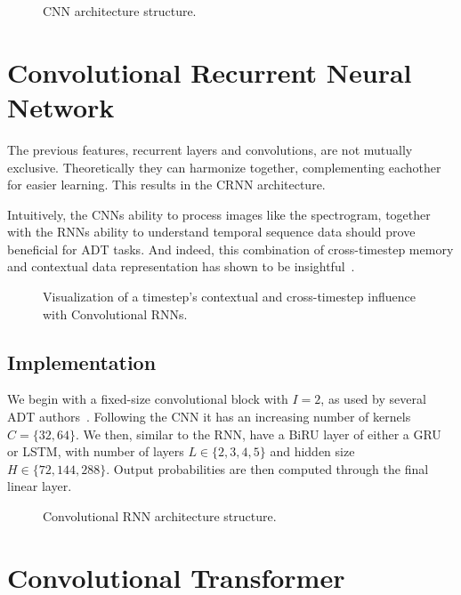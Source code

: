 \begin{figure}[H]
    \centering
    
    \caption{CNN architecture structure.}
    \label{CNNFigure}
\end{figure}

\section[Convolutional RNN]{Convolutional Recurrent Neural Network}

The previous features, recurrent layers and convolutions, are not mutually exclusive. Theoretically they can harmonize together, complementing eachother for easier learning. This results in the \gls{CRNN} architecture.

Intuitively, the \gls{CNN}s ability to process images like the spectrogram, together with the \gls{RNN}s ability to understand temporal sequence data should prove beneficial for \gls{ADT} tasks. And indeed, this combination of cross-timestep memory and contextual data representation has shown to be insightful~\cite{Vogl2017DrumTV, vogl2018multiinstrumentdrumtranscription, signals4040042}.

\begin{figure}[H]
    \centering
    
    \caption{Visualization of a timestep's contextual and cross-timestep influence with Convolutional RNNs.}
    \label{CRNNInfluenceFigure}
\end{figure}

\subsection{Implementation}

We begin with a fixed-size convolutional block with $I = 2$, as used by several \gls{ADT} authors~\cite{Vogl2017DrumTV, signals4040042}. Following the \gls{CNN} it has an increasing number of kernels $C = \{32, 64\}$. We then, similar to the \gls{RNN}, have a \gls{BiRU} layer of either a \gls{GRU} or \gls{LSTM}, with number of layers $L \in \{2, 3, 4, 5\}$ and hidden size $H \in \{72, 144, 288\}$. Output probabilities are then computed through the final linear layer.

\begin{figure}[H]
    \centering
    
    \caption{Convolutional RNN architecture structure.}
    \label{CRNNFigure}
\end{figure}

\section{Convolutional Transformer}

